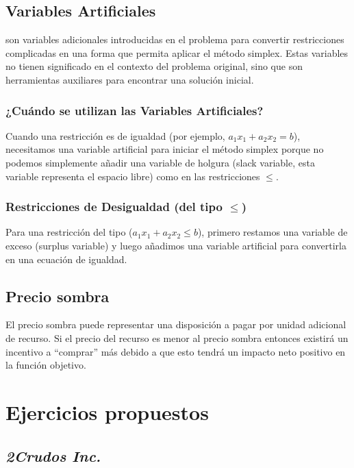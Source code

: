 \documentclass[conference]{IEEEtran}
\begin{document}
\subsection{Variables Artificiales}

son variables adicionales introducidas en el problema para convertir
restricciones complicadas en una forma que permita aplicar el método
simplex. Estas variables no tienen significado en el contexto del problema
original, sino que son herramientas auxiliares para encontrar una
solución inicial.

\subsubsection*{¿Cuándo se utilizan las Variables Artificiales?}

Cuando una restricción es de igualdad (por ejemplo,
$a_{1}x_{1} + a_{2}x_{2} = b$), necesitamos una
variable artificial para iniciar el método simplex porque no podemos
simplemente añadir una variable de holgura (slack variable, esta variable
representa el espacio libre) como en las
restricciones $\leq$.

\subsubsection*{Restricciones de Desigualdad (del tipo $\leq$)}

Para una restricción del tipo ($a_{1}x_{1} + a_{2}x_{2} \leq b$), primero restamos una variable de
exceso (surplus variable) y luego añadimos una variable artificial para
convertirla en una ecuación de igualdad.

\subsection{Precio sombra}

El precio sombra puede representar una disposición a pagar por unidad
adicional de recurso. Si el precio del recurso es menor al precio sombra
entonces existirá un incentivo a ``comprar'' más debido a que esto tendrá un
impacto neto positivo en la función objetivo.

\section{Ejercicios propuestos}

\subsection{\textit{2Crudos Inc.}}
\end{document}
